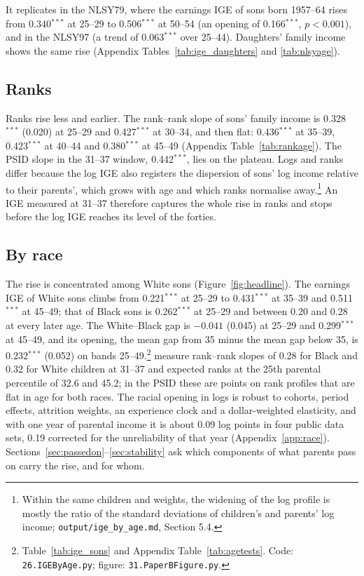  It replicates in the NLSY79, where the earnings IGE of sons born 1957--64 rises from 0.340$^{***}$ at
25--29 to 0.506$^{***}$ at 50--54 (an opening of 0.166$^{***}$, $p<0.001$), and in the NLSY97 (a trend of 0.063$^{***}$ over
25--44). Daughters' family income shows the same rise (Appendix Tables~\ref{tab:ige_daughters} and \ref{tab:nlsyage}).

\subsection{Ranks}

Ranks rise less and earlier. The rank--rank slope of sons' family income is 0.328$^{***}$ (0.020) at 25--29 and
0.427$^{***}$ at 30--34, and then flat: 0.436$^{***}$ at 35--39, 0.423$^{***}$ at 40--44 and 0.380$^{***}$ at 45--49
(Appendix Table~\ref{tab:rankage}). The PSID slope in the 31--37 window, 0.442$^{***}$, lies on the plateau. Logs and
ranks differ because the log IGE also registers the dispersion of sons' log income relative to their parents', which
grows with age and which ranks normalise away.\footnote{Within the same children and weights, the widening of the
log profile is mostly the ratio of the standard deviations of children's and parents' log income;
\texttt{output/ige\_by\_age.md}, Section 5.4.} An IGE measured at 31--37 therefore captures the whole rise in ranks and
stops before the log IGE reaches its level of the forties.

\subsection{By race}

The rise is concentrated among White sons (Figure~\ref{fig:headline}). The earnings IGE of White sons climbs from
0.221$^{***}$ at 25--29 to 0.431$^{***}$ at 35--39 and 0.511$^{***}$ at 45--49; that of Black sons is 0.262$^{***}$ at
25--29 and between 0.20 and 0.28 at every later age. The White--Black gap is $-0.041$ (0.045) at 25--29 and
0.299$^{***}$ at 45--49, and its opening, the mean gap from 35 minus the mean gap below 35, is 0.232$^{***}$ (0.052) on
bands 25--49.\footnote{Table~\ref{tab:ige_sons} and Appendix Table~\ref{tab:agetests}. Code: \texttt{26.IGEByAge.py};
figure: \texttt{31.PaperBFigure.py}.} \citet{chetty2020race} measure rank--rank slopes of 0.28 for Black and 0.32 for
White children at 31--37 and expected ranks at the 25th parental percentile of 32.6 and 45.2; in the PSID these are
points on rank profiles that are flat in age for both races. The racial opening in logs is robust to cohorts, period
effects, attrition weights, an experience clock and a dollar-weighted elasticity, and with one year of parental income it
is about 0.09 log points in four public data sets, 0.19 corrected for the unreliability of that year (Appendix~\ref{app:race}).
Sections~\ref{sec:passedon}--\ref{sec:stability} ask which components of what parents pass on carry the rise, and for
whom.

